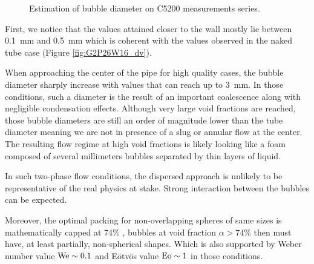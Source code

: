\begin{figure}[!h]
\centering
{}

\caption{Estimation of bubble diameter on C5200 measurements series.}
\label{fig:exp_C52_dvap}
\end{figure}

\npar

First, we notice that the values attained closer to the wall mostly lie between 0.1\ mm and 0.5\ mm which is coherent with the values observed in the naked tube case (Figure \ref{fig:G2P26W16_dv}).

\npar

When approaching the center of the pipe for high quality cases, the bubble diameter sharply increase with values that can reach up to 3\ mm. In those conditions, such a diameter is the result of an important coalescence along with negligible condensation effects. Although very large void fractions are reached, those bubble diameters are still an order of magnitude lower than the tube diameter meaning we are not in presence of a slug or annular flow at the center. The resulting flow regime at high void fractions is likely looking like a foam composed of several millimeters bubbles separated by thin layers of liquid.

\begin{remark*}{}
In such two-phase flow conditions, the dispersed approach is unlikely to be representative of the real physics at stake. Strong interaction between the bubbles can be expected. %

\npar

Moreover, the optimal packing for non-overlapping spheres of same sizes is mathematically capped at 74\% \cite{wu_bulk_2003}, bubbles at void fraction $\alpha > 74\%$ then must have, at least partially, non-spherical shapes. Which is also supported by Weber number value $\mathrm{We} \sim 0.1$ and E\"otv\"os value $\mathrm{Eo} \sim 1$ in those conditions.
\end{remark*}

